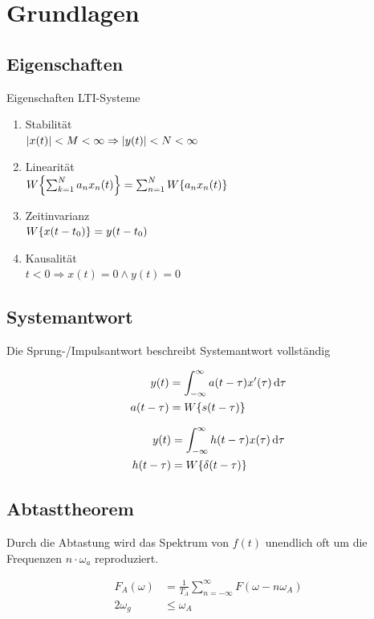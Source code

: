 \documentclass[10pt,a4paper]{article}
\begin{document}
\section{Grundlagen}
  \subsection{Eigenschaften}
  Eigenschaften LTI-Systeme
  \begin{mdframed}[style=exercise]
    \begin{enumerate}
      \item Stabilität\\
      $\abs{x(t)} < M < \infty \Rightarrow \abs{y(t)} < N < \infty$
      \item Linearität\\
      $W\qty{\sum_{k=1}^{N}a_n x_n(t)}=\sum_{n=1}^{N}W\qty{a_n x_n(t)}$
      \item Zeitinvarianz\\
      $W\qty{x(t-t_0)} =y(t-t_0)$
      \item Kausalität\\
      $t < 0 \Rightarrow x(t)=0 \land y(t)=0$
    \end{enumerate}
  \end{mdframed}
  \subsection{Systemantwort}
  Die Sprung-/Impulsantwort beschreibt Systemantwort vollständig
  \begin{mdframed}[style=exercise]
    \begin{align}
      y(t) &= \int^{\infty}_{-\infty} a(t-\tau) x'(\tau) \dd{\tau}\\
      a(t-\tau) &= W\qty{s(t-\tau)}\nonumber
    \end{align}
  \end{mdframed}
  \begin{mdframed}[style=exercise]
    \begin{align}
      y(t) &= \int_{-\infty}^{\infty} h(t-\tau) x(\tau) \dd{\tau}\\
      h(t-\tau) &= W\qty{\delta(t-\tau)}\nonumber
    \end{align}
  \end{mdframed}
  \subsection{Abtasttheorem}
  Durch die Abtastung wird das Spektrum von $f(t)$ unendlich oft um die Frequenzen $n\cdot \omega_a$ reproduziert.
  \begin{mdframed}[style=exercise]
    \begin{align}
      F_A(\omega) &= \frac{1}{T_A} \sum_{n=-\infty}^{\infty} F(\omega-n\omega_A)\\
      2\omega_g &\leq \omega_A\nonumber
    \end{align}
  \end{mdframed}
\end{document}
